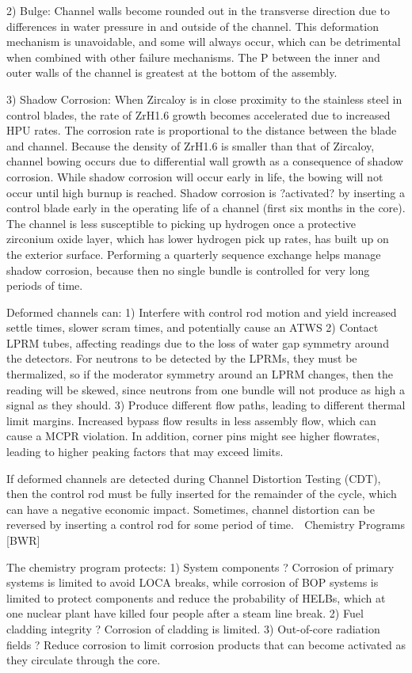 \documentclass[10pt]{article}
\begin{document}
2)	Bulge: Channel walls become rounded out in the transverse direction due to differences in water pressure in and outside of the channel. This deformation mechanism is unavoidable, and some will always occur, which can be detrimental when combined with other failure mechanisms. The P between the inner and outer walls of the channel is greatest at the bottom of the assembly. 

3)	Shadow Corrosion: When Zircaloy is in close proximity to the stainless steel in control blades, the rate of ZrH1.6 growth becomes accelerated due to increased HPU rates. The corrosion rate is proportional to the distance between the blade and channel. Because the density of ZrH1.6 is smaller than that of Zircaloy, channel bowing occurs due to differential wall growth as a consequence of shadow corrosion. While shadow corrosion will occur early in life, the bowing will not occur until high burnup is reached. Shadow corrosion is ?activated? by inserting a control blade early in the operating life of a channel (first six months in the core). The channel is less susceptible to picking up hydrogen once a protective zirconium oxide layer, which has lower hydrogen pick up rates, has built up on the exterior surface. Performing a quarterly sequence exchange helps manage shadow corrosion, because then no single bundle is controlled for very long periods of time. 

Deformed channels can:
1)	Interfere with control rod motion and yield increased settle times, slower scram times, and potentially cause an ATWS
2)	Contact LPRM tubes, affecting readings due to the loss of water gap symmetry around the detectors. For neutrons to be detected by the LPRMs, they must be thermalized, so if the moderator symmetry around an LPRM changes, then the reading will be skewed, since neutrons from one bundle will not produce as high a signal as they should. 
3)	Produce different flow paths, leading to different thermal limit margins. Increased bypass flow results in less assembly flow, which can cause a MCPR violation. In addition, corner pins might see higher flowrates, leading to higher peaking factors that may exceed limits. 

If deformed channels are detected during Channel Distortion Testing (CDT), then the control rod must be fully inserted for the remainder of the cycle, which can have a negative economic impact. Sometimes, channel distortion can be reversed by inserting a control rod for some period of time. 
Chemistry Programs [BWR]

The chemistry program protects:
1)	System components ? Corrosion of primary systems is limited to avoid LOCA breaks, while corrosion of BOP systems is limited to protect components and reduce the probability of HELBs, which at one nuclear plant have killed four people after a steam line break. 
2)	Fuel cladding integrity ? Corrosion of cladding is limited.
3)	Out-of-core radiation fields ? Reduce corrosion to limit corrosion products that can become activated as they circulate through the core.
\end{document}
